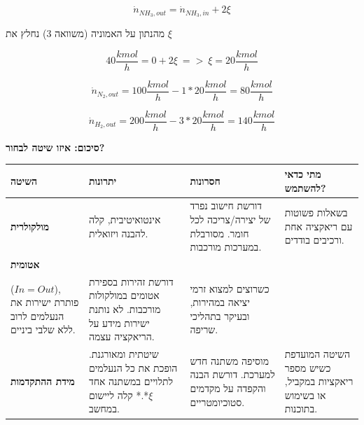 \documentclass[
  hebrew,
  letterpaper,
  DIV=11,
  numbers=noendperiod]{scrreprt}
\begin{document}
\[{\dot{n}}_{{NH}_{3},out} = {\dot{n}}_{{NH}_{3},in} + 2\xi\]

מהנתון על האמוניה (משוואה 3) נחלץ את \(\xi\)

\[40\frac{kmol}{h} = 0 + 2\xi\  = > \ \xi = 20\frac{kmol}{h}\]

\[{\dot{n}}_{N_{2},out} = 100\frac{kmol}{h} - 1*20\frac{kmol}{h} = 80\frac{kmol}{h}\]

\[{\dot{n}}_{H_{2},out} = 200\frac{kmol}{h} - 3*20\frac{kmol}{h} = 140\frac{kmol}{h}\]

\textbf{סיכום: איזו שיטה לבחור?}

\begin{longtable}[]{@{}
  >{\raggedright\arraybackslash}p{}
  >{\raggedright\arraybackslash}p{}
  >{\raggedright\arraybackslash}p{}
  >{\raggedright\arraybackslash}p{}@{}}
\toprule\noalign{}
\begin{minipage}[b]{\linewidth}\raggedright
\textbf{השיטה}
\end{minipage} & \begin{minipage}[b]{\linewidth}\raggedright
\textbf{יתרונות}
\end{minipage} & \begin{minipage}[b]{\linewidth}\raggedright
\textbf{חסרונות}
\end{minipage} & \begin{minipage}[b]{\linewidth}\raggedright
\textbf{מתי כדאי להשתמש?}
\end{minipage} \\
\midrule\noalign{}
\endhead
\bottomrule\noalign{}
\endlastfoot
\textbf{מולקולרית} & אינטואיטיבית, קלה להבנה ויזואלית. & דורשת חישוב
נפרד של יצירה/צריכה לכל חומר. מסורבלת במערכות מורכבות. & בשאלות פשוטות
עם ריאקציה אחת ורכיבים בודדים. \\
\textbf{אטומית} & \begin{minipage}[t]{\linewidth}\raggedright
משוואות פשוטות\\
(\(In = Out\)), פותרת ישירות את הנעלמים לרוב ללא שלבי ביניים.\strut
\end{minipage} & דורשת זהירות בספירת אטומים במולקולות מורכבות. לא נותנת
ישירות מידע על הריאקציה עצמה. & כשרוצים למצוא זרמי יציאה במהירות, ובעיקר
בתהליכי שריפה. \\
\textbf{מידת ההתקדמות} & שיטתית ומאורגנת. הופכת את כל הנעלמים לתלויים
במשתנה אחד \(\xi\)*.* קלה ליישום במחשב. & מוסיפה משתנה חדש למערכת. דורשת
הבנה והקפדה על מקדמים סטוכיומטריים. & השיטה המועדפת כשיש מספר ריאקציות
במקביל, או בשימוש בתוכנות. \\
\end{longtable}
\end{document}
